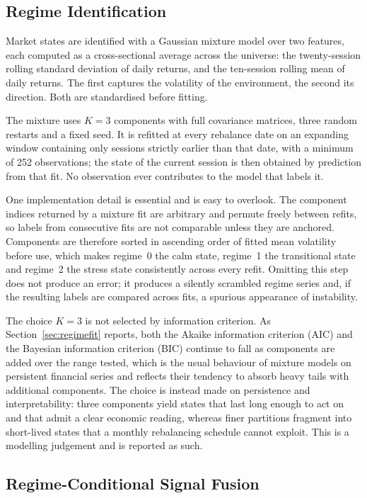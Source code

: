 \subsection{Regime Identification}

Market states are identified with a Gaussian mixture model over two features, each
computed as a cross-sectional average across the universe: the twenty-session rolling
standard deviation of daily returns, and the ten-session rolling mean of daily returns.
The first captures the volatility of the environment, the second its direction. Both
are standardised before fitting.

The mixture uses $K = 3$ components with full covariance matrices, three random
restarts and a fixed seed. It is refitted at every rebalance date on an expanding
window containing only sessions strictly earlier than that date, with a minimum of 252
observations; the state of the current session is then obtained by prediction from that
fit. No observation ever contributes to the model that labels it.

One implementation detail is essential and is easy to overlook. The component indices
returned by a mixture fit are arbitrary and permute freely between refits, so labels
from consecutive fits are not comparable unless they are anchored. Components are
therefore sorted in ascending order of fitted mean volatility before use, which makes
regime~0 the calm state, regime~1 the transitional state and regime~2 the stress state
consistently across every refit. Omitting this step does not produce an error; it
produces a silently scrambled regime series and, if the resulting labels are compared
across fits, a spurious appearance of instability.

The choice $K = 3$ is not selected by information criterion. As
Section~\ref{sec:regimefit} reports, both the Akaike information criterion (AIC)
and the Bayesian information criterion (BIC) continue to fall as components are added
over the range tested, which is the usual behaviour of mixture models on
persistent financial series and reflects their tendency to absorb heavy tails with
additional components. The choice is instead made on persistence and interpretability:
three components yield states that last long enough to act on and that admit a clear
economic reading, whereas finer partitions fragment into short-lived states that a
monthly rebalancing schedule cannot exploit. This is a modelling judgement and is
reported as such.

\subsection{Regime-Conditional Signal Fusion}

